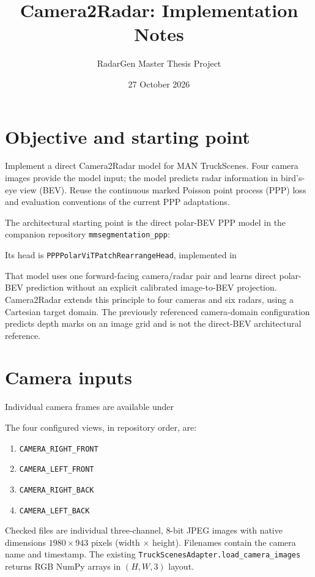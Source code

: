 \documentclass[11pt,a4paper]{article}
\title{Camera2Radar: Implementation Notes}
\author{RadarGen Master Thesis Project}
\date{27 October 2026}
\begin{document}
\maketitle

\section{Objective and starting point}
Implement a direct Camera2Radar model for MAN TruckScenes. Four camera images provide the model input; the model predicts radar information in bird's-eye view (BEV). Reuse the continuous marked Poisson point process (PPP) loss and evaluation conventions of the current PPP adaptations.

The architectural starting point is the direct polar-BEV PPP model in the companion repository \texttt{mmsegmentation\_ppp}:
\begin{quote}\small{}\end{quote}
Its head is \texttt{PPPPolarViTPatchRearrangeHead}, implemented in
\begin{quote}\small{}\end{quote}
That model uses one forward-facing camera/radar pair and learns direct polar-BEV prediction without an explicit calibrated image-to-BEV projection. Camera2Radar extends this principle to four cameras and six radars, using a Cartesian target domain. The previously referenced camera-domain configuration predicts depth marks on an image grid and is not the direct-BEV architectural reference.

\section{Camera inputs}
Individual camera frames are available under
\begin{quote}\small{}\end{quote}
The four configured views, in repository order, are:
\begin{enumerate}[nosep]
\item \texttt{CAMERA\_RIGHT\_FRONT}
\item \texttt{CAMERA\_LEFT\_FRONT}
\item \texttt{CAMERA\_RIGHT\_BACK}
\item \texttt{CAMERA\_LEFT\_BACK}
\end{enumerate}
Checked files are individual three-channel, 8-bit JPEG images with native dimensions $1980\times943$ pixels (width $\times$ height). Filenames contain the camera name and timestamp. The existing \texttt{TruckScenesAdapter.load\_camera\_images} returns RGB NumPy arrays in $(H,W,3)$ layout.
\end{document}
